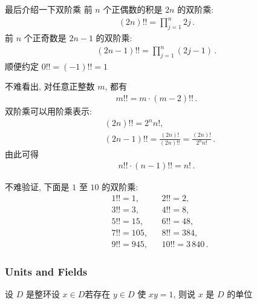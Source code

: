 \begin{definition}
    最后介绍一下双阶乘 \period 前 $n$ 个正偶数的积是 $2n$ 的双阶乘:
    \begin{align*}
        (2n)!! = \prod_{j=1}^{n} {2j} \period
    \end{align*}
    前 $n$ 个正奇数是 $2n-1$ 的双阶乘:
    \begin{align*}
        (2n-1)!! = \prod_{j=1}^{n} {(2j-1)} \period
    \end{align*}
    顺便约定 $0!! = (-1)!! = 1$\period
\end{definition}

\begin{remark}
    不难看出, 对任意正整数 $m$, 都有
    \begin{align*}
        m!! = m \cdot (m-2)!! \period
    \end{align*}
    双阶乘可以用阶乘表示:
    \begin{align*}
         & (2n)!! = 2^n n!,                                               \\
         & (2n-1)!! = \frac{(2n)!}{(2n)!!} = \frac{(2n)!}{2^n n!} \period
    \end{align*}
    由此可得
    \begin{align*}
        n!! \cdot (n-1)!! = n! \period
    \end{align*}
\end{remark}

\begin{example}
    不难验证, 下面是 $1$ 至 $10$ 的双阶乘:
    \begin{align*}
         & 1!! = 1,   &  & 2!! = 2,              \\
         & 3!! = 3,   &  & 4!! = 8,              \\
         & 5!! = 15,  &  & 6!! = 48,             \\
         & 7!! = 105, &  & 8!! = 384,            \\
         & 9!! = 945, &  & 10!! = 3\,840 \period
    \end{align*}
\end{example}

\subsubsection*{Units and Fields}

\begin{definition}
    设 $D$ 是整环\period 设 $x \in D$\period 若存在 $y \in D$ 使 $xy=1$, 则说 $x$ 是 $D$ 的单位 \period
\end{definition}

